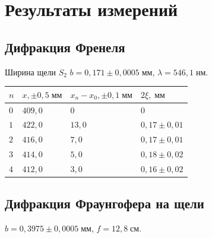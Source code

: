 \section{Результаты измерений}
\subsection{Дифракция Френеля}
Ширина щели $S_{2}$ $b = 0{,}171 \pm 0{,}0005\;\text{мм}$, $\lambda = 546{,}1\;\text{нм}$.

\begin{tabular}{|l|l|l|l|}
\hline
$n$ & $x,\pm 0{,}5\;\text{мм}$ & $x_{n} - x_{0}, \pm 0{,}1\;\text{мм}$ & $2\xi,\;\text{мм}$ \\\hline
   $0$ & $409{,}0$ & $0$ & $0$ \\\hline
    $1$ & $422{,}0$ & $13{,}0$ & $0{,}17 \pm 0{,}01$ \\\hline
    $2$ & $416{,}0$ & $7{,}0$ & $0{,}17 \pm 0{,}01$ \\\hline
    $3$ & $414{,}0$ & $5{,}0$ & $0{,}18 \pm 0{,}02$ \\\hline
    $4$ & $412{,}0$ & $3{,}0$ & $0{,}16 \pm 0{,}02$ \\\hline
\end{tabular}

\begin{figure}[ht!]
\end{figure}

\subsection{Дифракция Фраунгофера на щели}
$b = 0{,}3975 \pm 0{,}0005\;\text{мм}$, $f = 12{,}8\;\text{см}$. 

